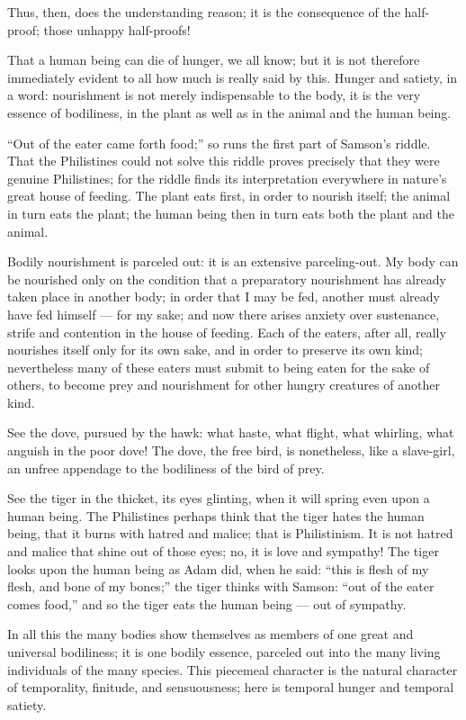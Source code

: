 \documentclass[12pt,a4paper]{book}
\begin{document}
Thus, then, does the understanding reason; it is the consequence of the half-proof; those unhappy half-proofs!

That a human being can die of hunger, we all know; but it is not therefore immediately evident to all how much is really said by this. Hunger and satiety, in a word: nourishment is not merely indispensable to the body, it is the very essence of bodiliness, in the plant as well as in the animal and the human being.

``Out of the eater came forth food;'' so runs the first part of Samson's riddle. That the Philistines could not solve this riddle proves precisely that they were genuine Philistines; for the riddle finds its interpretation everywhere in nature's great house of feeding. The plant eats first, in order to nourish itself; the animal in turn eats the plant; the human being then in turn eats both the plant and the animal.

Bodily nourishment is parceled out: it is an extensive parceling-out. My body can be nourished only on the condition that a preparatory nourishment has already taken place in another body; in order that I may be fed, another must already have fed himself --- for my sake; and now there arises anxiety over sustenance, strife and contention in the house of feeding.
Each of the eaters, after all, really nourishes itself only for its own sake, and in order to preserve its own kind; nevertheless many of these eaters must submit to being eaten for the sake of others, to become prey and nourishment for other hungry creatures of another kind.

See the dove, pursued by the hawk: what haste, what flight, what whirling, what anguish in the poor dove! The dove, the free bird, is nonetheless, like a slave-girl, an unfree appendage to the bodiliness of the bird of prey.

See the tiger in the thicket, its eyes glinting, when it will spring even upon a human being. The Philistines perhaps think that the tiger hates the human being, that it burns with hatred and malice; that is Philistinism. It is not hatred and malice that shine out of those eyes; no, it is love and sympathy! The tiger looks upon the human being as Adam did, when he said: ``this is flesh of my flesh, and bone of my bones;'' the tiger thinks with Samson: ``out of the eater comes food,'' and so the tiger eats the human being --- out of sympathy.

In all this the many bodies show themselves as members of one great and universal bodiliness; it is one bodily essence, parceled out into the many living individuals of the many species. This piecemeal character is the natural character of temporality, finitude, and sensuousness; here is temporal hunger and temporal satiety.
\end{document}
